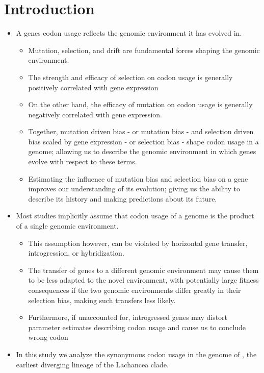 \documentclass[12pt]{article}
\begin{document}
\section*{Introduction}
\begin{itemize}
	\item A genes codon usage reflects the genomic environment it has evolved in.
	\begin{itemize}
		\item Mutation, selection, and drift are fundamental forces shaping the genomic environment.
		\item The strength and efficacy of selection on codon usage is generally positively correlated with gene expression
		\item On the other hand, the efficacy of mutation on codon usage is generally negatively correlated with gene expression.
		\item Together, mutation driven bias - or mutation bias - and selection driven bias scaled by gene expression - or selection bias - shape codon usage in a genome; allowing us to describe the genomic environment in which genes evolve with respect to these terms.
		\item Estimating the influence of mutation bias and selection bias on a gene improves our understanding of its evolution; giving us the ability to describe its history and making predictions about its future.
	\end{itemize}
	\item Most studies implicitly assume that codon usage of a genome is the product of a single genomic environment.
	\begin{itemize}
		\item This assumption however, can be violated by horizontal gene transfer, introgression, or hybridization.
		\item The transfer of genes to a different genomic environment may cause them to be less adapted to the novel environment, with potentially large fitness consequences if the two genomic environments differ greatly in their selection bias, making such transfers less likely.
		\item Furthermore, if unaccounted for, introgressed genes may distort parameter estimates describing codon usage and cause us to conclude wrong codon
	\end{itemize}
	\item In this study we analyze the synonymous codon usage in the genome of \kluyveri, the earliest diverging lineage of the Lachancea clade.

\end{itemize}
\end{document}
